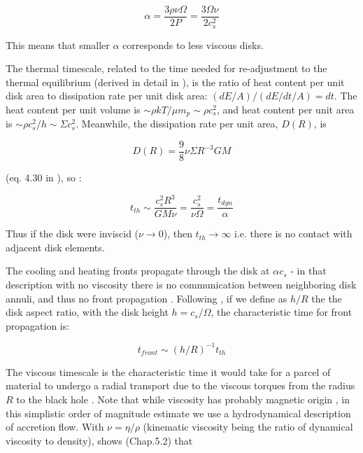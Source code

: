 \documentclass[twocolumn]{aastex62}
\begin{document}
\begin{equation}
\alpha  =   \frac{3 \rho \nu \Omega}{2 P} =  \frac{3 \Omega \nu}{2 c_{s}^{2}}
\end{equation}



This means that smaller $\alpha$ corresponds to less viscous disks. 


The thermal timescale, related to the time needed for re-adjustment to the thermal equilibrium (derived in detail in \cite{frank2002}), is the ratio of heat content per unit disk area to dissipation rate per unit disk area: $(dE / A) / (dE/dt /  A) = dt $.  The heat content per unit volume is ${\sim} \rho k T / \mu m_{p} {\sim} \rho c_{s}^{2}$, and heat content per unit area is  ${\sim} \rho c_{s}^{2} / h {\sim} \Sigma c_{s}^{2}$. Meanwhile, the dissipation rate per unit area, $D(R)$, is 

\begin{equation}
D(R) = \frac{9}{8} \nu \Sigma R^{-3} G M
\end{equation}

(eq. 4.30 in \citealt{frank2002}), so :

\begin{equation}
t_{th} {\sim} \frac{c_{s}^{2}R^{3}}{G M \nu } = \frac{c_{s}^{2}}{\nu \Omega} = \frac{t_{dyn}}{\alpha}
\end{equation}

Thus if the disk were inviscid ($\nu \rightarrow 0$), then $t_{th}\rightarrow\infty$ i.e. there is no contact with adjacent disk elements. 

The cooling and heating fronts propagate through the disk at  $\alpha c_{s} $ \citep{hameury2009}  - in that description  with no viscosity there is no communication between neighboring disk annuli, and thus no front propagation \citep{balbus1998, balbus2003}. Following \cite{stern2018}, if we define as $h/R$  the the disk aspect ratio, with the disk height $h = c_{s} / \Omega$, the characteristic time for front propagation is:

\begin{equation}
t_{front} {\sim} (h/R) ^ {-1} t_{th}
\end{equation}


The viscous timescale is the characteristic time it would take for a parcel of material to undergo a radial transport due to the viscous torques from the radius $R$ to the black hole \citep{czerny2006}. Note that while viscosity has probably magnetic origin \citep{eardley1975, grzedzielski2017}, in this simplistic order of magnitude estimate we use a hydrodynamical description of accretion flow.  With $\nu = \eta / \rho$ (kinematic viscosity being the ratio of dynamical viscosity to density), \cite{frank2002} shows (Chap.5.2) that 
\end{document}
